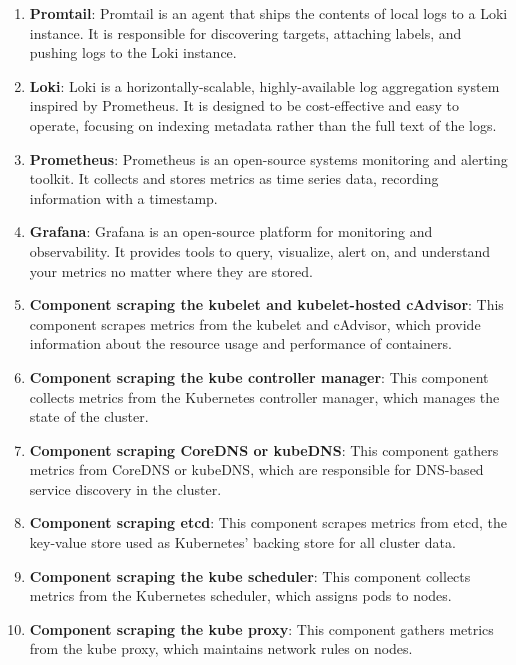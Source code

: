 \begin{enumerate}
    \item \textbf{Promtail}: Promtail is an agent that ships the contents of local logs to a Loki instance. It is responsible for discovering targets, attaching labels, and pushing logs to the Loki instance.
    
    \item \textbf{Loki}: Loki is a horizontally-scalable, highly-available log aggregation system inspired by Prometheus. It is designed to be cost-effective and easy to operate, focusing on indexing metadata rather than the full text of the logs.
    
    \item \textbf{Prometheus}: Prometheus is an open-source systems monitoring and alerting toolkit. It collects and stores metrics as time series data, recording information with a timestamp.
    
    \item \textbf{Grafana}: Grafana is an open-source platform for monitoring and observability. It provides tools to query, visualize, alert on, and understand your metrics no matter where they are stored.
    
    \item \textbf{Component scraping the kubelet and kubelet-hosted cAdvisor}: This component scrapes metrics from the kubelet and cAdvisor, which provide information about the resource usage and performance of containers.
    
    \item \textbf{Component scraping the kube controller manager}: This component collects metrics from the Kubernetes controller manager, which manages the state of the cluster.
    
    \item \textbf{Component scraping CoreDNS or kubeDNS}: This component gathers metrics from CoreDNS or kubeDNS, which are responsible for DNS-based service discovery in the cluster.
    
    \item \textbf{Component scraping etcd}: This component scrapes metrics from etcd, the key-value store used as Kubernetes' backing store for all cluster data.
    
    \item \textbf{Component scraping the kube scheduler}: This component collects metrics from the Kubernetes scheduler, which assigns pods to nodes.
    
    \item \textbf{Component scraping the kube proxy}: This component gathers metrics from the kube proxy, which maintains network rules on nodes.
    

\end{enumerate}
